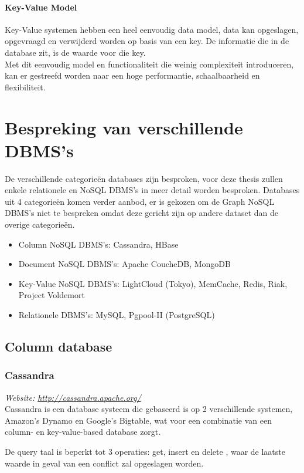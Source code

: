 \paragraph{Key-Value Model} Key-Value systemen hebben een heel eenvoudig data model, data kan opgeslagen, opgevraagd en verwijderd worden op basis van een key. De informatie die in de database zit, is de waarde voor die key. \\
Met dit eenvoudig model en functionaliteit die weinig complexiteit introduceren, kan er gestreefd worden naar een hoge performantie, schaalbaarheid en flexibiliteit. \cite{Strauch.NoSQL}

\section{Bespreking van verschillende DBMS's}\label{sec:BesprekingDBMS}
De verschillende categorieën databases zijn besproken, voor deze thesis zullen enkele relationele en NoSQL DBMS's in meer detail worden besproken. Databases uit 4 categorieën komen verder aanbod, er is gekozen om de Graph NoSQL DBMS's niet te bespreken omdat deze gericht zijn op andere dataset dan de overige categorieën. 
\begin{itemize}
\item Column NoSQL DBMS's: Cassandra, HBase
\item Document NoSQL DBMS's: Apache CoucheDB, MongoDB
\item Key-Value NoSQL DBMS's: LightCloud (Tokyo), MemCache, Redis, Riak, Project Voldemort
\item Relationele DBMS's: MySQL, Pgpool-II (PostgreSQL)
\end{itemize}

\subsection{Column database}
\subsubsection{Cassandra}
\textit{Website: \url{http://cassandra.apache.org/}}\\
Cassandra is een database systeem die gebaseerd is op 2 verschillende systemen, Amazon's Dynamo en Google's Bigtable, wat voor een combinatie van een column- en key-value-based database zorgt. 

De query taal is beperkt tot 3 operaties: get, insert en delete \cite{Lakshman:2010:CDS:1773912.1773922}, waar de  laatste waarde in geval van een conflict zal opgeslagen worden.


